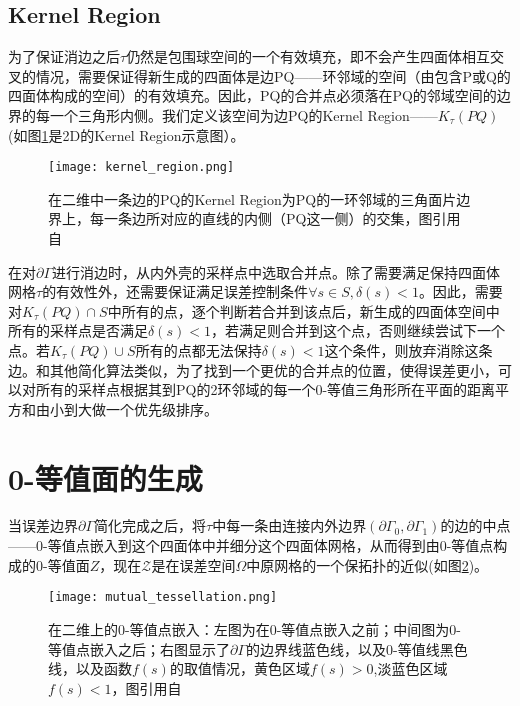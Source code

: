 \subsection{Kernel Region}
为了保证消边之后$\tau$仍然是包围球空间的一个有效填充，即不会产生四面体相互交叉的情况，需要保证得新生成的四面体是边PQ——环邻域的空间（由包含P或Q的四面体构成的空间）的有效填充。因此，PQ的合并点必须落在PQ的邻域空间的边界的每一个三角形内侧。我们定义该空间为边PQ的Kernel Region——$K_\tau(PQ)$(如图\ref{fig:kernel-region}是2D的Kernel Region示意图）。
\begin{figure}[htbp]
    \centering
    \texttt{[image: kernel\_region.png]}
    \caption[2D Kernel Region]{在二维中一条边的PQ的Kernel Region为PQ的一环邻域的三角面片边界上，每一条边所对应的直线的内侧（PQ这一侧）的交集，图引用自\cite{isotopic-appro}}
    \label{fig:kernel-region}
\end{figure}
\par 在对$\partial \Gamma$进行消边时，从内外壳的采样点中选取合并点。除了需要满足保持四面体网格$\tau$的有效性外，还需要保证满足误差控制条件$\forall s \in S, \delta(s) < 1$。因此，需要对$K_\tau (PQ) \cap S$中所有的点，逐个判断若合并到该点后，新生成的四面体空间中所有的采样点是否满足$\delta(s) < 1$，若满足则合并到这个点，否则继续尝试下一个点。若$K_\tau (PQ) \cup S$所有的点都无法保持$\delta(s) < 1$这个条件，则放弃消除这条边。和其他简化算法类似，为了找到一个更优的合并点的位置，使得误差更小，可以对所有的采样点根据其到PQ的2环邻域的每一个0-等值三角形所在平面的距离平方和由小到大做一个优先级排序。
\section{0-等值面的生成}
当误差边界$\partial \Gamma$简化完成之后，将$\tau$中每一条由连接内外边界$(\partial \Gamma_0, \partial \Gamma_1)$的边的中点——0-等值点嵌入到这个四面体中并细分这个四面体网格，从而得到由0-等值点构成的0-等值面$\mathcal{Ζ}$，现在$\mathcal{Z}$是在误差空间$\Omega$中原网格的一个保拓扑的近似(如图\ref{fig:mutual-tessellation})。
\begin{figure}[htbp]
    \centering
    \texttt{[image: mutual\_tessellation.png]}
    \caption[Mutual tessellation]{在二维上的0-等值点嵌入：左图为在0-等值点嵌入之前；中间图为0-等值点嵌入之后；右图显示了$\partial \Gamma$的边界线蓝色线，以及0-等值线黑色线，以及函数$f(s)$的取值情况，黄色区域$f(s) > 0$,淡蓝色区域$f(s) < 1$，图引用自\cite{isotopic-appro}}
    \label{fig:mutual-tessellation}
\end{figure}

